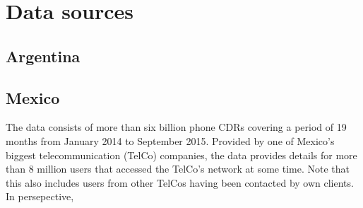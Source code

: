 \section{Data sources}
\subsection{Argentina}

\subsection{Mexico}

The data consists of more than six billion phone CDRs covering a period of 19 months from January 2014 to September 2015. Provided by one of Mexico's biggest telecommunication (TelCo) companies, the data provides details for more than 8 million users that accessed the TelCo's network at some time. Note that this also includes users from other TelCos having been contacted by own clients. In persepective, 

